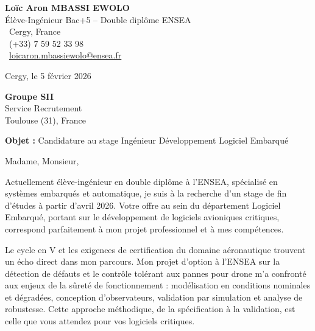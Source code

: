 \documentclass[a4paper,11pt]{article}
\begin{document}
\noindent
\begin{minipage}[t]{0.5\textwidth}
    \textbf{Loïc Aron MBASSI EWOLO}\\
    Élève-Ingénieur Bac+5 -- Double diplôme ENSEA\\[3pt]
    \faMapMarker\ Cergy, France\\
    \faPhone\ (+33) 7 59 52 33 98\\
    \faEnvelope\ \href{mailto:loicaron.mbassiewolo@ensea.fr}{loicaron.mbassiewolo@ensea.fr}
\end{minipage}
\hfill
\begin{minipage}[t]{0.4\textwidth}
    \raggedleft
    Cergy, le 5 février 2026
\end{minipage}

\vspace{1.2cm}

\hfill
\begin{minipage}[t]{0.5\textwidth}
    \raggedleft
    \textbf{Groupe SII}\\
    Service Recrutement\\
    Toulouse (31), France
\end{minipage}

\vspace{1cm}

\noindent\textbf{Objet :} Candidature au stage Ingénieur Développement Logiciel Embarqué

\vspace{0.8cm}

Madame, Monsieur,

Actuellement élève-ingénieur en double diplôme à l'ENSEA, spécialisé en systèmes embarqués et automatique, je suis à la recherche d'un stage de fin d'études à partir d'avril 2026. Votre offre au sein du département Logiciel Embarqué, portant sur le développement de logiciels avioniques critiques, correspond parfaitement à mon projet professionnel et à mes compétences.

Le cycle en V et les exigences de certification du domaine aéronautique trouvent un écho direct dans mon parcours. Mon projet d'option à l'ENSEA sur la détection de défauts et le contrôle tolérant aux pannes pour drone m'a confronté aux enjeux de la sûreté de fonctionnement : modélisation en conditions nominales et dégradées, conception d'observateurs, validation par simulation et analyse de robustesse. Cette approche méthodique, de la spécification à la validation, est celle que vous attendez pour vos logiciels critiques.
\end{document}
